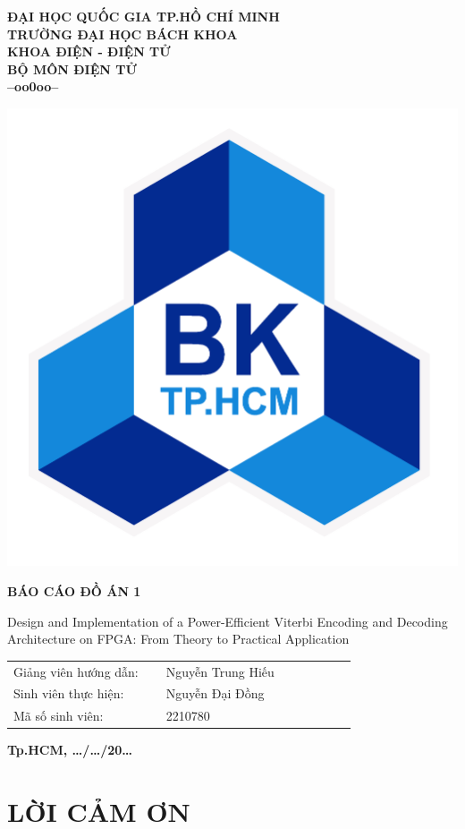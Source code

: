 \begin{center}
	\Large\textbf{ĐẠI HỌC QUỐC GIA TP.HỒ CHÍ MINH \\ TRƯỜNG ĐẠI HỌC BÁCH KHOA\\ KHOA ĐIỆN - ĐIỆN TỬ \\ BỘ MÔN ĐIỆN TỬ \\--oo0oo--}
\end{center}
\vspace{0.4cm}
\begin{center}
	\includegraphics[width=0.3\linewidth]{sections/pic/01_logobachkhoatoi.png}
\end{center}
\vspace{0.4cm}
\begin{center}
	\LARGE\textbf{BÁO CÁO ĐỒ ÁN 1}
	\vspace{0.1cm}
	
	\Large{Design and Implementation of a Power-Efficient Viterbi
		Encoding and Decoding Architecture on FPGA: From
		Theory to Practical Application}
\end{center}
\vspace{1cm}

\LARGE

\hspace{2cm}\begin{tabular}{p{0.4\linewidth} p{0.5\linewidth}}
	Giảng viên hướng dẫn: & Nguyễn Trung Hiếu\\
	Sinh viên thực hiện:  & Nguyễn Đại Đồng \\
	Mã số sinh viên:      & 2210780
\end{tabular}

\vspace{5cm}
\begin{center}
	\fontsize{8pt}{5pt}\selectfont\textbf{Tp.HCM, \dots/\dots/20\dots}
\end{center}

\newpage
\pagestyle{fancy}
\fontsize{13}{14}\selectfont
{}
\section*{\centering LỜI CẢM ƠN}


